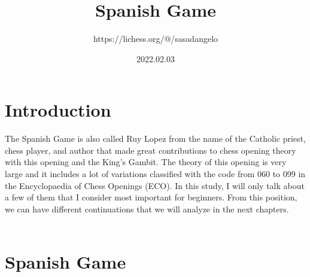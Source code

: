 \documentclass{article}
\title{Spanish Game}
\author{https://lichess.org/@/sasadangelo}
\date{2022.02.03}
\begin{document}
\begin{titlepage}
\maketitle
\end{titlepage}
\section{ Introduction}

The Spanish Game is also called Ruy Lopez from the name of the Catholic priest, chess player, and author that made great contributions to chess opening theory with this opening and the King's Gambit. The theory of this opening is very large and it includes a lot of variations classified with the code from 060 to 099 in the Encyclopaedia of Chess Openings (ECO). In this study, I will only talk about a few of them that I consider most important for beginners. From this position, we can have different continuations that we will analyze in the next chapters.\\
\\
\section{ Spanish Game}
\end{document}
